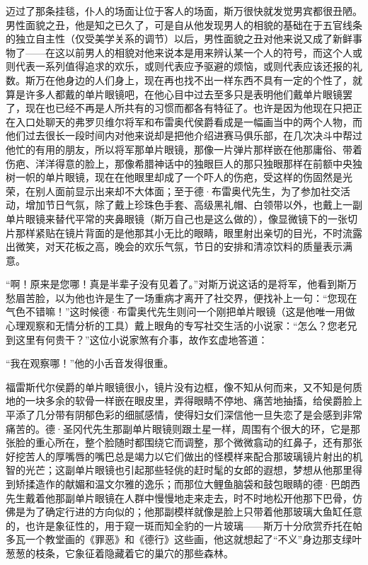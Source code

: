 \par 迈过了那条挂毯，仆人的场面让位于客人的场面，斯万很快就发觉男宾都很丑陋。男性面貌之丑，他是知之已久了，可是自从他发现男人的相貌的基础在于五官线条的独立自主性（仅受美学关系的调节）以后，男性面貌之丑对他来说又成了新鲜事物了——在这以前男人的相貌对他来说本是用来辨认某一个人的符号，而这个人或则代表一系列值得追求的欢乐，或则代表应予驱避的烦恼，或则代表应该还报的礼数。斯万在他身边的人们身上，现在再也找不出一样东西不具有一定的个性了，就算是许多人都戴的单片眼镜吧，在他心目中过去至多只是表明他们戴单片眼镜罢了，现在也已经不再是人所共有的习惯而都各有特征了。也许是因为他现在只把正在入口处聊天的弗罗贝维尔将军和布雷奥代侯爵看成是一幅画当中的两个人物，而他们过去很长一段时间内对他来说却是把他介绍进赛马俱乐部，在几次决斗中帮过他忙的有用的朋友，所以将军那单片眼镜，那像一片弹片那样嵌在他那庸俗、带着伤疤、洋洋得意的脸上，那像希腊神话中的独眼巨人的那只独眼那样在前额中央独树一帜的单片眼镜，现在在他眼里却成了一个吓人的伤疤，受这样的伤固然是光荣，在别人面前显示出来却不大体面；至于德·布雷奥代先生，为了参加社交活动，增加节日气氛，除了戴上珍珠色手套、高级黑礼帽、白领带以外，也戴上一副单片眼镜来替代平常的夹鼻眼镜（斯万自己也是这么做的），像显微镜下的一张切片那样紧贴在镜片背面的是他那其小无比的眼睛，眼里射出亲切的目光，不时流露出微笑，对天花板之高，晚会的欢乐气氛，节日的安排和清凉饮料的质量表示满意。
\par “啊！原来是您哪！真是半辈子没有见着了。”对斯万说这话的是将军，他看到斯万愁眉苦脸，以为他也许是生了一场重病才离开了社交界，便找补上一句：“您现在气色不错嘛！”这时候德·布雷奥代先生则问一个刚把单片眼镜（这是他唯一用做心理观察和无情分析的工具）戴上眼角的专写社交生活的小说家：“怎么？您老兄到这里有何贵干？”这位小说家煞有介事，故作玄虚地答道：
\par “我在观察哪！”他的小舌音发得很重。
\par 福雷斯代尔侯爵的单片眼镜很小，镜片没有边框，像不知从何而来，又不知是何质地的一块多余的软骨一样嵌在眼皮里，弄得眼睛不停地、痛苦地抽搐，给侯爵脸上平添了几分带有阴郁色彩的细腻感情，使得妇女们深信他一旦失恋了是会感到非常痛苦的。德·圣冈代先生那副单片眼镜则跟土星一样，周围有个很大的环，它是那张脸的重心所在，整个脸随时都围绕它而调整，那个微微翕动的红鼻子，还有那张好挖苦人的厚嘴唇的嘴巴总是竭力以它们做出的怪模样来配合那玻璃镜片射出的机智的光芒；这副单片眼镜也引起那些轻佻的赶时髦的女郎的遐想，梦想从他那里得到矫揉造作的献媚和温文尔雅的逸乐；而那位大鲤鱼脑袋和鼓包眼睛的德·巴朗西先生戴着他那副单片眼镜在人群中慢慢地走来走去，时不时地松开他那下巴骨，仿佛是为了确定行进的方向似的；他那副模样就像是脸上只带着他那玻璃大鱼缸任意的，也许是象征性的，用于窥一斑而知全豹的一片玻璃——斯万十分欣赏乔托在帕多瓦一个教堂画的《罪恶》和《德行》这些画，他这就想起了“不义”身边那支绿叶葱葱的枝条，它象征着隐藏着它的巢穴的那些森林。
